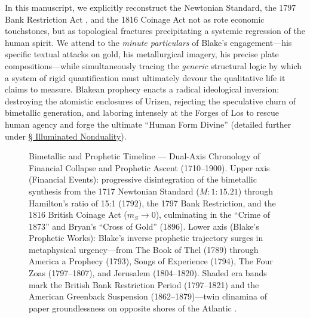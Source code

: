\documentclass[
]{article}
\makeatletter
\newcommand*\pandocbounded[1]{%
  \sbox\pandoc@box{#1}%
  \Gscale@div\@tempa{\textheight}{\dimexpr\ht\pandoc@box+\dp\pandoc@box\relax}%
  \Gscale@div\@tempb{\linewidth}{\wd\pandoc@box}%
  \ifdim\@tempb\p@<\@tempa\p@\let\@tempa\@tempb\fi%
  \ifdim\@tempa\p@<\p@\scalebox{\@tempa}{\usebox\pandoc@box}%
  \else\usebox{\pandoc@box}%
  \fi%
}
\makeatother
\begin{document}
In this manuscript, we explicitly reconstruct the Newtonian Standard,
the 1797 Bank Restriction Act
\citep{clapham1944bank, fetter1965development}, and the 1816 Coinage Act
\citep{redish1990evolution} not as rote economic touchstones, but as
topological fractures precipitating a systemic regression of the human
spirit. We attend to the \emph{minute particulars} of Blake's
engagement---his specific textual attacks on gold, his metallurgical
imagery, his precise plate compositions---while simultaneously tracing
the \emph{generic} structural logic by which a system of rigid
quantification must ultimately devour the qualitative life it claims to
measure. Blakean prophecy enacts a radical ideological inversion:
destroying the atomistic enclosures of Urizen, rejecting the speculative
churn of bimetallic generation, and laboring intensely at the Forges of
Los to rescue human agency and forge the ultimate ``Human Form Divine''
(detailed further under \hyperref[sec-illuminated-nonduality]{§
Illuminated Nonduality}).

\begin{figure}
\centering
\pandocbounded{\includegraphics[keepaspectratio,alt={Bimetallic and Prophetic Timeline --- Dual-Axis Chronology of Financial Collapse and Prophetic Ascent (1710--1900). Upper axis (Financial Events): progressive disintegration of the bimetallic synthesis from the 1717 Newtonian Standard (M: 1:15.21) through Hamilton's ratio of 15:1 (1792), the 1797 Bank Restriction, and the 1816 British Coinage Act (m\_S \textbackslash to 0), culminating in the ``Crime of 1873'' and Bryan's ``Cross of Gold'' (1896). Lower axis (Blake's Prophetic Works): Blake's inverse prophetic trajectory surges in metaphysical urgency---from The Book of Thel (1789) through America a Prophecy (1793), Songs of Experience (1794), The Four Zoas (1797--1807), and Jerusalem (1804--1820). Shaded era bands mark the British Bank Restriction Period (1797--1821) and the American Greenback Suspension (1862--1879)---twin clinamina of paper groundlessness on opposite shores of the Atlantic {[}@fetter1965development; @laughlin1898bimetallism{]}.}]{../figures/timeline_dark.pdf}}
\caption{Bimetallic and Prophetic Timeline --- Dual-Axis Chronology of
Financial Collapse and Prophetic Ascent (1710--1900). Upper axis
(Financial Events): progressive disintegration of the bimetallic
synthesis from the 1717 Newtonian Standard (\(M: 1:15.21\)) through
Hamilton's ratio of 15:1 (1792), the 1797 Bank Restriction, and the 1816
British Coinage Act (\(m_S \to 0\)), culminating in the ``Crime of
1873'' and Bryan's ``Cross of Gold'' (1896). Lower axis (Blake's
Prophetic Works): Blake's inverse prophetic trajectory surges in
metaphysical urgency---from The Book of Thel (1789) through America a
Prophecy (1793), Songs of Experience (1794), The Four Zoas (1797--1807),
and Jerusalem (1804--1820). Shaded era bands mark the British Bank
Restriction Period (1797--1821) and the American Greenback Suspension
(1862--1879)---twin clinamina of paper groundlessness on opposite shores
of the Atlantic
\citep{fetter1965development, laughlin1898bimetallism}.}\label{fig-timeline}
\end{figure}
\end{document}
